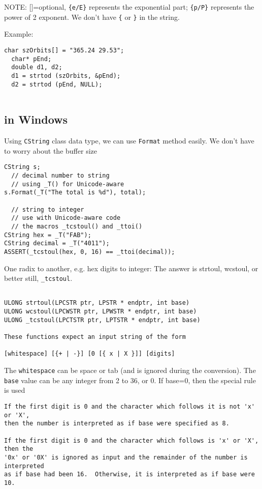NOTE: []=optional, \verb!{e/E}! represents the exponential part; \verb!{p/P}!
represents the power of 2 exponent. We don't have \verb!{! or \verb!}! in the
string.

Example:
\begin{verbatim}
char szOrbits[] = "365.24 29.53";
  char* pEnd;
  double d1, d2;
  d1 = strtod (szOrbits, &pEnd);
  d2 = strtod (pEnd, NULL);
  
\end{verbatim}


\subsection{in Windows}

Using \verb!CString! class data type, we can use \verb!Format! method easily. We
don't have to worry about the buffer size

\begin{verbatim}
CString s;
  // decimal number to string
  // using _T() for Unicode-aware
s.Format(_T("The total is %d"), total);

  // string to integer
  // use with Unicode-aware code
  // the macros _tcstoul() and _ttoi()
CString hex = _T("FAB");
CString decimal = _T("4011");
ASSERT(_tcstoul(hex, 0, 16) == _ttoi(decimal));
\end{verbatim}

One radix to another, e.g. hex digits to integer: The answer is strtoul,
wcstoul, or better still, \verb!_tcstoul!.
\begin{verbatim}

ULONG strtoul(LPCSTR ptr, LPSTR * endptr, int base)
ULONG wcstoul(LPCWSTR ptr, LPWSTR * endptr, int base)
ULONG _tcstoul(LPCTSTR ptr, LPTSTR * endptr, int base)

These functions expect an input string of the form

[whitespace] [{+ | -}] [0 [{ x | X }]] [digits]
\end{verbatim}
The \verb!whitespace! can be space or tab (and is ignored during the
conversion). The \verb!base! value can be any integer from 2 to 36, or 0. If
base=0, then the special rule is used
\begin{verbatim}
If the first digit is 0 and the character which follows it is not 'x' or 'X',
then the number is interpreted as if base were specified as 8.  

If the first digit is 0 and the character which follows is 'x' or 'X', then the
'0x' or '0X' is ignored as input and the remainder of the number is interpreted
as if base had been 16.  Otherwise, it is interpreted as if base were 10.    
\end{verbatim}


